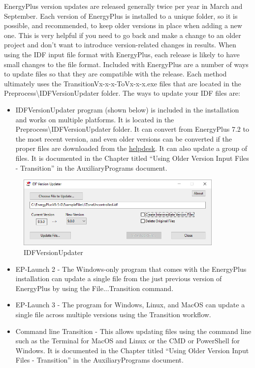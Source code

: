 EnergyPlus version updates are released generally twice per year in
March and September. Each version of EnergyPlus is installed to a
unique folder, so it is possible, and recommended, to keep older versions
in place when adding a new one. This is very helpful if you need to
go back and make a change to an older project and don't want to introduce
version-related changes in results. When using the IDF input file
format with EnergyPlus, each release is likely to have small changes
to the file format. Included with EnergyPlus are a number of ways
to update files so that they are compatible with the release. Each
method ultimately uses the TransitionVx-x-x-ToVx-x-x.exe files that
are located in the Preprocess\textbackslash IDFVersionUpdater folder.
The ways to update your IDF files are:
\begin{itemize}
\item IDFVersionUpdater program (shown below) is included in the installation
and works on multiple platforms. It is located in the Preprocess\textbackslash IDFVersionUpdater
folder. It can convert from EnergyPlus 7.2 to the most recent version,
and even older versions can be converted if the proper files are downloaded
from the \href{http://energyplus.helpserve.com/Knowledgebase/List/Index/46/converting-older-version-files}{helpdesk}.
It can also update a group of files. It is documented in the Chapter
titled ``Using Older Version Input Files - Transition'' in the AuxiliaryPrograms
document.
\end{itemize}

\begin{figure}[hbtp]
\centering
\includegraphics[width=0.9\textwidth, height=0.9\textheight, keepaspectratio=true]{media/IDFVersionUpdater.png}
\caption{IDFVersionUpdater}
\end{figure}

\begin{itemize}
\item EP-Launch 2 - The Windows-only program that comes with the EnergyPlus
installation can update a single file from the just previous version
of EnergyPlus by using the File...Transition command.
\item EP-Launch 3 - The program for Windows, Linux, and MacOS can update
a single file across multiple versions using the Transition workflow.
\item Command line Transition - This allows updating files using the command
line such as the Terminal for MacOS and Linux or the CMD or PowerShell
for Windows. It is documented in the Chapter titled ``Using Older
Version Input Files - Transition'' in the AuxiliaryPrograms document.
\end{itemize}

